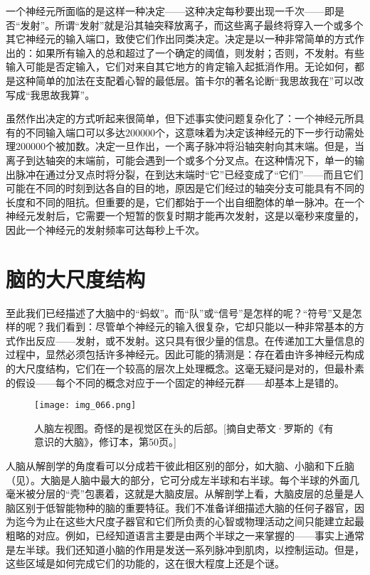 一个神经元所面临的是这样一种决定——这种决定每秒要出现一千次——即是否“发射”。所谓“发射”就是沿其轴突释放离子，而这些离子最终将穿入一个或多个其它神经元的输入端口，致使它们作出同类决定。决定是以一种非常简单的方式作出的：如果所有输入的总和超过了一个确定的阈值，则发射；否则，不发射。有些输入可能是否定输入，它们对来自其它地方的肯定输入起抵消作用。无论如何，都是这种简单的加法在支配着心智的最低层。笛卡尔的著名论断“我思故我在”可以改写成“我思故我算”。

虽然作出决定的方式听起来很简单，但下述事实使问题复杂化了：一个神经元所具有的不同输入端口可以多达$200000$个，这意味着为决定该神经元的下一步行动需处理$200000$个被加数。决定一旦作出，一个离子脉冲将沿轴突射向其末端。但是，当离子到达轴突的末端前，可能会遇到一个或多个分叉点。在这种情况下，单一的输出脉冲在通过分叉点时将分裂，在到达末端时“它”已经变成了“它们”——而且它们可能在不同的时刻到达各自的目的地，原因是它们经过的轴突分支可能具有不同的长度和不同的阻抗。但重要的是，它们都始于一个出自细胞体的单一脉冲。在一个神经元发射后，它需要一个短暂的恢复时期才能再次发射，这是以毫秒来度量的，因此一个神经元的发射频率可达每秒上千次。

\section{脑的大尺度结构}

至此我们已经描述了大脑中的“蚂蚁”。而“队”或“信号”是怎样的呢？“符号”又是怎样的呢？我们看到：尽管单个神经元的输入很复杂，它却只能以一种非常基本的方式作出反应——发射，或不发射。这只具有很少量的信息。在传递加工大量信息的过程中，显然必须包括许多神经元。因此可能的猜测是：存在着由许多神经元构成的大尺度结构，它们在一个较高的层次上处理概念。这毫无疑问是对的，但最朴素的假设——每个不同的概念对应于一个固定的神经元群——却基本上是错的。

\begin{figure}
\texttt{[image: img\_066.png]}
\caption[人脑左视阁。]
  {人脑左视图。奇怪的是视觉区在头的后部。[摘自史蒂文·罗斯的《有意识的大脑》，修订本，第50页。] }
\end{figure}

人脑从解剖学的角度看可以分成若干彼此相区别的部分，如大脑、小脑和下丘脑（见）。大脑是人脑中最大的部分，它可分成左半球和右半球。每个半球的外面几毫米被分层的“壳”包裹着，这就是大脑皮层。从解剖学上看，大脑皮层的总量是人脑区别于低智能物种的脑的重要特征。我们不准备详细描述大脑的任何子器官，因为迄今为止在这些大尺度子器官和它们所负责的心智或物理活动之间只能建立起最粗略的对应。例如，已经知道语言主要是由两个半球之一来掌握的——事实上通常是左半球。我们还知道小脑的作用是发送一系列脉冲到肌肉，以控制运动。但是，这些区域是如何完成它们的功能的，这在很大程度上还是个谜。

